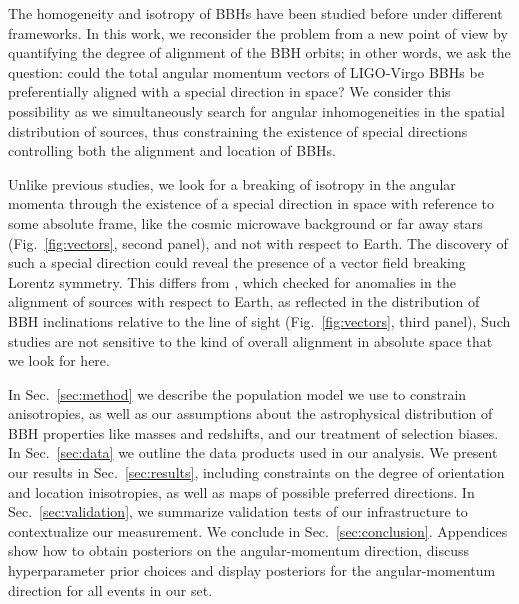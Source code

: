 \documentclass[twocolumn,twocolappendix,linenumbers]{aastex631}
\begin{document}
The homogeneity \citep{Stiskalek:2020wbj,Payne:2020pmc,Cavaglia:2020fnc,Essick:2022slj} and isotropy \citep{Vitale:2022pmu} of \acp{BBH} have been studied before under different frameworks.
In this work, we reconsider the problem from a new point of view by quantifying the degree of alignment of the \ac{BBH} orbits; in other words, we ask the question: could the total angular momentum vectors of LIGO-Virgo \acp{BBH} be preferentially aligned with a special direction in space?
We consider this possibility as we simultaneously search for angular inhomogeneities in the spatial distribution of sources, thus constraining the existence of special directions controlling both the alignment and location of \acp{BBH}.

Unlike previous studies, we look for a breaking of isotropy in the angular momenta through the existence of a special direction in space with reference to some absolute frame, like the cosmic microwave background or far away stars (Fig.~\ref{fig:vectors}, second panel), and not with respect to Earth.
The discovery of such a special direction could reveal the presence of a vector field breaking Lorentz symmetry.
This differs from  \citet{Vitale:2022pmu}, which checked for anomalies in the alignment of sources with respect to Earth, as reflected in the distribution of \ac{BBH} inclinations relative to the line of sight (Fig.~\ref{fig:vectors}, third panel), 
Such studies are not sensitive to the kind of overall alignment in absolute space that we look for here.


In Sec.~\ref{sec:method} we describe the population model we use to constrain anisotropies, as well as our assumptions about the astrophysical distribution of \ac{BBH} properties like masses and redshifts, and our treatment of selection biases.
In Sec.~\ref{sec:data} we outline the data products used in our analysis.
We present our results in Sec.~\ref{sec:results}, including constraints on the degree of orientation and location inisotropies, as well as maps of possible preferred directions.
In Sec.~\ref{sec:validation}, we summarize validation tests of our infrastructure to contextualize our measurement.
We conclude in Sec.~\ref{sec:conclusion}.
Appendices show how to obtain posteriors on the angular-momentum direction, discuss hyperparameter prior choices and display posteriors for the angular-momentum direction for all events in our set.
\end{document}
